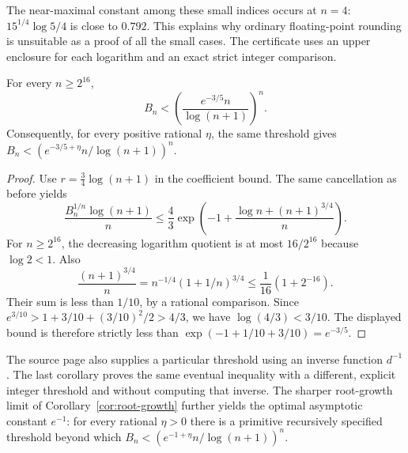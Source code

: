The near-maximal constant among these small indices occurs at $n=4$:
$15^{1/4}\log5/4$ is close to $0.792$.  This explains why ordinary
floating-point rounding is unsuitable as a proof of all the small cases.
The certificate uses an upper enclosure for each logarithm and an exact
strict integer comparison.

\begin{corollary}
For every $n\ge2^{16}$,
\begin{equation}\label{eq:eventual-six-tenths}
 B_n<\left(\frac{e^{-3/5}n}{\log(n+1)}\right)^n.
\end{equation}
Consequently, for every positive rational $\eta$, the same threshold gives
$B_n<(e^{-3/5+\eta}n/\log(n+1))^n$.
\end{corollary}
\begin{proof}
Use $r=\tfrac34\log(n+1)$ in the coefficient bound.  The same cancellation
as before yields
\[
 \frac{B_n^{1/n}\log(n+1)}n
 \le\frac43\exp\left(-1+
             \frac{\log n+(n+1)^{3/4}}n\right).
\]
For $n\ge2^{16}$, the decreasing logarithm quotient is at most
$16/2^{16}$ because $\log2<1$.  Also
\[
 \frac{(n+1)^{3/4}}n
 =n^{-1/4}(1+1/n)^{3/4}
 \le\frac1{16}(1+2^{-16}).
\]
Their sum is less than $1/10$, by a rational comparison.
Since $e^{3/10}>1+3/10+(3/10)^2/2>4/3$, we have
$\log(4/3)<3/10$.  The displayed bound is therefore strictly less than
$\exp(-1+1/10+3/10)=e^{-3/5}$.
\end{proof}

The source page also supplies a particular threshold using an inverse
function $d^{-1}$.  The last corollary proves the same eventual inequality
with a different, explicit integer threshold and without computing that
inverse.  The sharper root-growth limit of Corollary~\ref{cor:root-growth}
further yields the optimal asymptotic constant $e^{-1}$: for every rational
$\eta>0$ there is a primitive recursively specified threshold beyond which
$B_n<(e^{-1+\eta}n/\log(n+1))^n$.
